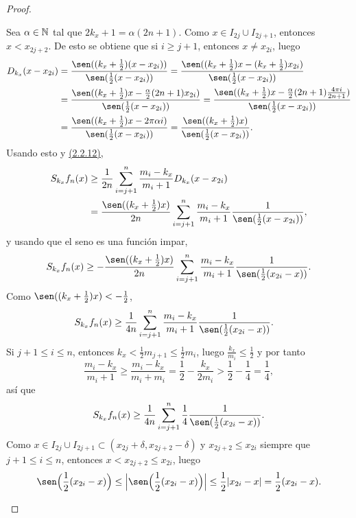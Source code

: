 \documentclass[a4paper, 12pt, oneside]{book}
\begin{document}
\begin{proof}
\begin{itemize}
        Sea $\alpha \in \mathbb N$ tal que $2k_x+1 = \alpha(2n+1)$. Como $x \in I_{2j} \cup I_{2j+1}$, entonces $x < x_{2j+2}$. De esto se obtiene que si $i \geq j+1$, entonces $x \neq x_{2i}$, luego
        \begin{align*}
            D_{k_x}(x-x_{2i}) &= \frac{\sen((k_x+\frac{1}{2})(x-x_{2i}))}{\sen(\frac{1}{2}(x-x_{2i}))} = \frac{\sen((k_x+\frac{1}{2})x-(k_x+\frac{1}{2})x_{2i})}{\sen(\frac{1}{2}(x-x_{2i}))} \\
            &= \frac{\sen((k_x+\frac{1}{2})x-\frac{\alpha}{2}(2n+1)x_{2i})}{\sen(\frac{1}{2}(x-x_{2i}))} = \frac{\sen((k_x+\frac{1}{2})x-\frac{\alpha}{2}(2n+1)\frac{4\pi i}{2n+1})}{\sen(\frac{1}{2}(x-x_{2i}))} \\
            &= \frac{\sen((k_x+\frac{1}{2})x-2\pi\alpha i)}{\sen(\frac{1}{2}(x-x_{2i}))} = \frac{\sen((k_x+\frac{1}{2})x)}{\sen(\frac{1}{2}(x-x_{2i}))}.
        \end{align*}
        Usando esto y \hyperref[2.2.12]{\color{blue}(2.2.12)},
        \begin{align*}
            S_{k_x}f_n(x) &\geq \frac{1}{2n}\sum_{i=j+1}^n \frac{m_i-k_x}{m_i+1}D_{k_x}(x-x_{2i}) \\
            &= \frac{\sen((k_x+\frac{1}{2})x)}{2n}\sum_{i=j+1}^n \frac{m_i-k_x}{m_i+1}\frac{1}{\sen(\frac{1}{2}(x-x_{2i}))},
        \end{align*}
        y usando que el seno es una función impar,
        \[S_{k_x}f_n(x) \geq -\frac{\sen((k_x+\frac{1}{2})x)}{2n}\sum_{i=j+1}^n \frac{m_i-k_x}{m_i+1}\frac{1}{\sen(\frac{1}{2}(x_{2i}-x))}.\]
        Como $\sen((k_x+\frac{1}{2})x) < -\frac{1}{2}$,
        \begin{align*}
            S_{k_x}f_n(x) &\geq \frac{1}{4n}\sum_{i=j+1}^n \frac{m_i-k_x}{m_i+1}\frac{1}{\sen(\frac{1}{2}(x_{2i}-x))}.
        \end{align*}
       Si $j+1 \leq i \leq n$, entonces $k_x < \frac{1}{2}m_{j+1} \leq \frac{1}{2}m_i$, luego $\frac{k_x}{m_i} \leq \frac{1}{2}$ y por tanto
            \[\frac{m_i-k_x}{m_i+1} \geq \frac{m_i-k_x}{m_i+m_i} = \frac{1}{2}-\frac{k_x}{2m_i} > \frac{1}{2}-\frac{1}{4} = \frac{1}{4},\]
        así que
        \[S_{k_x}f_n(x) \geq \frac{1}{4n}\sum_{i=j+1}^n \frac{1}{4}\frac{1}{\sen(\frac{1}{2}(x_{2i}-x))}.\]
        Como $x \in I_{2j} \cup I_{2j+1} \subset (x_{2j}+\delta,x_{2j+2}-\delta)$ y $x_{2j+2}\leq x_{2i}$ siempre que $j+1 \leq i \leq n$, entonces $x < x_{2j+2} \leq x_{2i}$, luego
        \[\sen\Bigl(\frac{1}{2}(x_{2i}-x)\Bigr) \leq \Bigl|\sen\Bigl(\frac{1}{2}(x_{2i}-x)\Bigr)\Bigr| \leq \frac{1}{2}|x_{2i}-x| = \frac{1}{2}(x_{2i}-x).\]

\end{itemize}
\end{proof}
\end{document}
